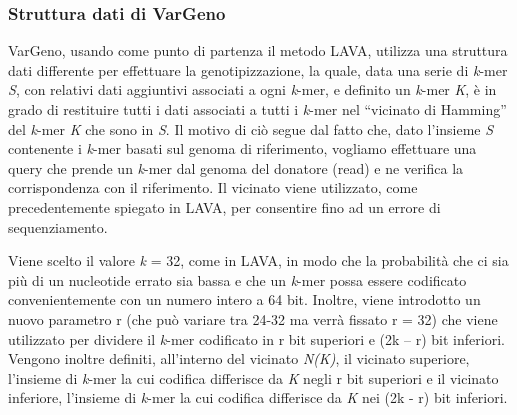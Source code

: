 \documentclass[../main.tex]{subfiles}
\begin{document}
\subsubsection{Struttura dati di VarGeno}
VarGeno, usando come punto di partenza il metodo LAVA, utilizza una struttura dati differente per effettuare la genotipizzazione, la quale, data una serie di \textit{k}-mer \textit{S}, con relativi dati aggiuntivi associati a ogni \textit{k}-mer, e definito un \textit{k}-mer \textit{K}, è in grado di restituire tutti i dati associati a tutti i \textit{k}-mer nel “vicinato di Hamming” del \textit{k}-mer \textit{K} che sono in \textit{S}. \textcolor{BurntOrange}{Il motivo di ciò segue dal fatto che, dato l'insieme \textit{S} contenente i \textit{k}-mer basati sul genoma di riferimento, vogliamo effettuare una query che prende un \textit{k}-mer dal genoma del donatore (read) e ne verifica la corrispondenza con il riferimento. Il vicinato viene utilizzato, come precedentemente spiegato in LAVA, per consentire fino ad un errore di sequenziamento.}

Viene scelto il valore \textit{k} = 32, come in LAVA, in modo che la probabilità che ci sia più di un nucleotide errato sia bassa e che un \textit{k}-mer possa essere codificato convenientemente con un numero intero a 64 bit. Inoltre, viene introdotto un nuovo parametro r (che può variare tra 24-32 ma verrà fissato r = 32) che viene utilizzato per dividere il \textit{k}-mer codificato in r bit superiori e (2k – r) bit inferiori. Vengono inoltre definiti, all'interno del vicinato \textit{N(K)}, il vicinato superiore, l'insieme di \textit{k}-mer la cui codifica differisce da \textit{K} negli r bit superiori e il vicinato inferiore, l'insieme di \textit{k}-mer la cui codifica differisce da \textit{K} nei (2k - r) bit inferiori.
\end{document}
